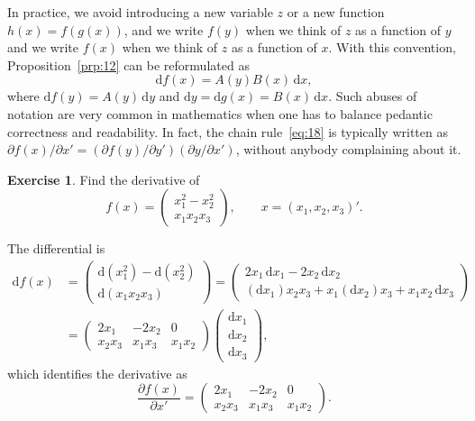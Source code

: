 \documentclass[12pt,a4paper]{article}
\makeatletter
\theoremstyle{definition}
\newtheorem{exercise}{Exercise}
\renewenvironment{proof}[1][\proofname]{\par
  \pushQED{\qed}%
  \normalfont \topsep6\p@\@plus6\p@\relax
  \trivlist
  \item[\hskip\labelsep\bfseries #1\@addpunct{.}]\ignorespaces
}{%
  \popQED\endtrivlist\@endpefalse
}
\newenvironment{solution}{%
  \begin{proof}[Solution]%
}{%
  \end{proof}%
}
\newcommand{\dd}{\mathrm{d}}
\makeatother
\begin{document}
In practice, we avoid introducing a new variable $z$ or a new function $h(x) = f(g(x))$, and we write $f(y)$ when we think of $z$ as a function of $y$ and we write $f(x)$ when we think of $z$ as a function of $x$. With this convention, Proposition~\ref{prp:12} can be reformulated as
\begin{equation}\label{eq:19}
\dd f(x) = A(y) B(x)\, \dd x,
\end{equation}
where $\dd f(y) = A(y)\, \dd y$ and $\dd y = \dd g(x) = B(x)\, \dd x$. %
Such abuses of notation are very common in mathematics when one has to balance pedantic correctness and readability. In fact, the chain rule~\eqref{eq:18} is typically written as $\partial f(x)/\partial x' = (\partial f(y)/\partial y')(\partial y/\partial x')$, without anybody complaining about it. %

\begin{exercise}\label{exer:12}
Find the derivative of
\[
f(x) = \begin{pmatrix} x_1^2 - x_2^2 \\ x_1 x_2 x_3 \end{pmatrix}, \qquad
x = (x_1, x_2, x_3)'.
\]
\end{exercise}

\begin{solution}
The differential is
\begin{align*}
\dd f(x) &= \begin{pmatrix} \dd(x_1^2) - \dd(x_2^2) \\ \dd(x_1 x_2 x_3) \end{pmatrix}
= \begin{pmatrix} 2x_1\, \dd x_1 - 2x_2\, \dd x_2 \\ (\dd x_1) x_2 x_3 + x_1 (\dd x_2) x_3 + x_1 x_2\, \dd x_3 \end{pmatrix} \\
&= \begin{pmatrix} 2x_1 & -2x_2 & 0 \\ x_2 x_3 & x_1 x_3 & x_1 x_2 \end{pmatrix}
\begin{pmatrix} \dd x_1 \\ \dd x_2 \\ \dd x_3 \end{pmatrix},
\end{align*}
which identifies the derivative as
\[
\frac{\partial f(x)}{\partial x'}
= \begin{pmatrix} 2x_1 & -2x_2 & 0 \\ x_2 x_3 & x_1 x_3 & x_1 x_2 \end{pmatrix}.
\]
\end{solution}
\end{document}
